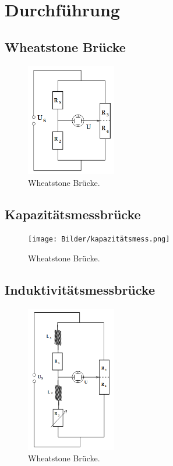 \section{Durchführung}
\label{sec:Durchführung}

\subsection{Wheatstone Brücke}
\begin{figure}[H]
    \centering
        \centering
        \includegraphics[width=0.35\textwidth]{Bilder/wheatstone.png}
        \caption{Wheatstone Brücke. \cite{anleitung}}
    \hfill
    \label{fig:f2}
\end{figure}


\subsection{Kapazitätsmessbrücke}
\begin{figure}[H]
    \centering
        \centering
        \texttt{[image: Bilder/kapazitätsmess.png]}
        \caption{Wheatstone Brücke. \cite{anleitung}}
    \hfill
    \label{fig:f3}
\end{figure}

\subsection{Induktivitätsmessbrücke}
\begin{figure}[H]
    \centering
        \centering
        \includegraphics[width=0.35\textwidth]{Bilder/induktivitaetsmess.png}
        \caption{Wheatstone Brücke. \cite{anleitung}}
    \hfill
    \label{fig:f4}
\end{figure}

